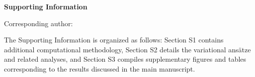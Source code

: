 \documentclass[letterpaper]{article}
\begin{document}
\begin{center}
    {\LARGE\bfseries Supporting Information\par}
    \vspace{1.5em}
    {\large\bfseries \ManuscriptTitle\par}
    \vspace{1em}
    {\normalsize \ManuscriptAuthorNames\par}
    {\normalsize \textsuperscript{\ManuscriptAffiliationIndex}\ManuscriptAffiliationOne\par}
    \vspace{0.5em}
    {\normalsize *Corresponding author: \CorrespondingAuthorEmail\par}
\end{center}

\vspace{1.5em}


\setcounter{section}{0}
\renewcommand{\thesection}{S\arabic{section}}
\renewcommand{\thesubsection}{\thesection.\arabic{subsection}}
\renewcommand{\thesubsubsection}{\thesubsection.\arabic{subsubsection}}
\renewcommand{\theHsection}{SI.\arabic{section}}
\renewcommand{\theHsubsection}{SI.\arabic{section}.\arabic{subsection}}
\renewcommand{\theHsubsubsection}{SI.\arabic{section}.\arabic{subsection}.\arabic{subsubsection}}

\setcounter{figure}{0}
\renewcommand{\thefigure}{S\arabic{figure}}
\renewcommand{\theHfigure}{SI.\arabic{figure}}

\setcounter{table}{0}
\renewcommand{\thetable}{S\arabic{table}}
\renewcommand{\theHtable}{SI.\arabic{table}}

\setcounter{equation}{0}
\renewcommand{\theequation}{S\arabic{equation}}
\renewcommand{\theHequation}{SI.\arabic{equation}}

The Supporting Information is organized as follows: Section S1 contains additional computational methodology, Section S2 details the variational ansätze and related analyses, and Section S3 compiles supplementary figures and tables corresponding to the results discussed in the main manuscript.





\clearpage
\printbibliography
\end{document}
